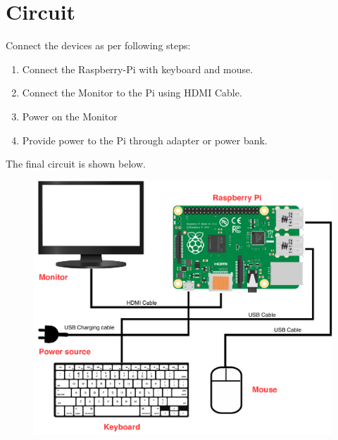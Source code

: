 \documentclass{article}
\begin{document}
\section{Circuit}
Connect the devices as per following steps:
\begin{enumerate}
\item Connect the Raspberry-Pi with keyboard and mouse.
\item Connect the Monitor to the Pi using HDMI Cable.
\item Power on the Monitor
\item Provide power to the Pi through adapter or power bank. 
\end{enumerate}
The final circuit is shown below. 
\begin{figure}[h]
\centering %
\includegraphics[width=13cm]{raspi-fog-circuit}
\end{figure}

\newpage
\end{document}
